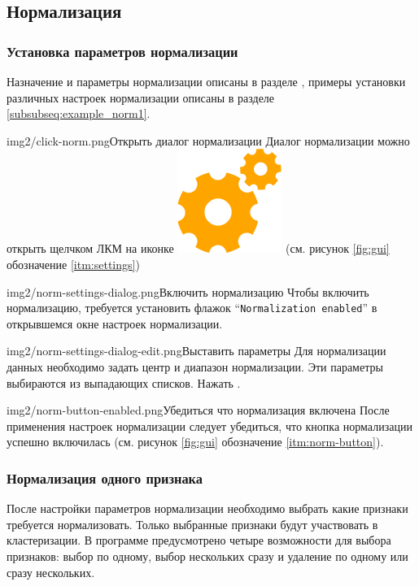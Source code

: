 \documentclass[12pt,tikz]{instruction}
\begin{document}
\subsection{Нормализация}
\label{sec:norm}
\subsubsection{Установка параметров нормализации}

Назначение и параметры нормализации описаны в разделе , примеры установки различных настроек нормализации описаны в разделе \ref{subsubseq:example_norm1}.
\begin{steps}
	\begin{ist}{img2/click-norm.png}{Открыть диалог нормализации}
		Диалог нормализации можно открыть щелчком ЛКМ на иконке \includegraphics[scale=0.1]{img2/settings.png} (см. рисунок \ref{fig:gui} обозначение \ref{itm:settings})
	\end{ist}
	\begin{ist}{img2/norm-settings-dialog.png}{Включить нормализацию}
		Чтобы включить нормализацию, требуется установить флажок ``\texttt{Normalization enabled}'' в открывшемся окне настроек нормализации.
	\end{ist}
	\begin{ist}{img2/norm-settings-dialog-edit.png}{Выставить параметры}
		Для нормализации данных необходимо задать центр и диапазон нормализации. Эти параметры выбираются из выпадающих списков. Нажать .
	\end{ist}
	\begin{ist}{img2/norm-button-enabled.png}{Убедиться что нормализация включена}
		После применения настроек нормализации следует убедиться, что кнопка нормализации успешно включилась (см. рисунок \ref{fig:gui} обозначение \ref{itm:norm-button}).	
	\end{ist}	
\end{steps}

\newpage
\subsubsection{Нормализация одного признака}
\label{subsubsec:onenorm}
После настройки параметров нормализации необходимо выбрать какие признаки требуется нормализовать. Только выбранные признаки будут участвовать в кластеризации. В программе предусмотрено четыре возможности для выбора признаков: выбор по одному, выбор нескольких сразу и удаление по одному или сразу нескольких. 
\end{document}
